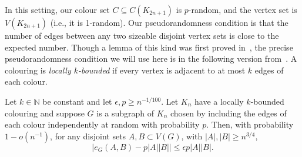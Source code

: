 
In this setting, our colour set $C\subseteq C(K_{2n+1})$ is $p$-random, and the vertex set is $V(K_{2n+1})$ (i.e., it is 1-random). Our pseudorandomness condition is that the number of edges between any two sizeable disjoint vertex sets is close to the expected number. Though a lemma of this kind was first proved in~\cite{alon2016random}, the precise pseudorandomness condition we will use here is in the following version from~\cite{MPS}. A colouring is \emph{locally $k$-bounded} if every vertex is adjacent to at most $k$ edges of each colour. 

\begin{lemma}\label{MPScolour}\label{Lemma_MPS_boundrandcolour} Let $k\in\mathbb N$ be constant and let $\epsilon, p\geq n^{-1/100}$. Let $K_n$ have a {locally}  $k$-bounded colouring and suppose $G$ is a subgraph of $K_n$ chosen by including the edges of each colour independently at random with probability $p$. Then, with  probability $1-o(n^{-1})$, for any disjoint sets $A,B\subset V(G)$, with $|A|,|B|\geq n^{3/4}$,
\[
\big|e_G(A,B)-p|A||B|\big|\leq \epsilon p|A||B|.
\]
\end{lemma}
 

